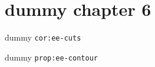 \clearpage\begingroup\small
\setcounter{chapter}{6}\addtocounter{chapter}{-1}
\chapter{dummy chapter 6}
\begin{corollary}\label{cor:ee-cuts}dummy \texttt{cor:ee-cuts}\end{corollary}
\begin{proposition}\label{prop:ee-contour}dummy \texttt{prop:ee-contour}\end{proposition}
\endgroup
